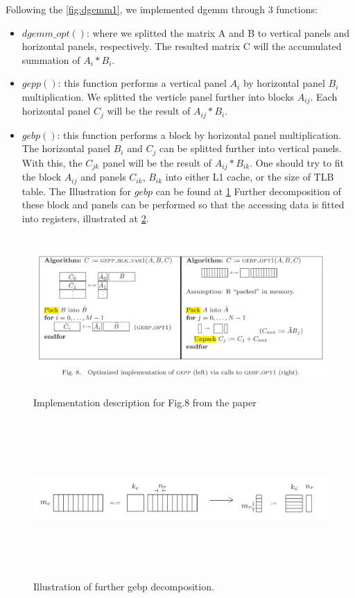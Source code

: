 \documentclass[article]{scrartcl}
\begin{document}
Following the \ref{fig:dgemm1}, we implemented dgemm through 3 functions:
\begin{itemize}
  \item $dgemm\_opt()$: where we splitted the matrix A and B to vertical panels and horizontal panels, respectively. The resulted matrix C will the accumulated summation of $A_i*B_i$.
  \item $gepp()$: this function performs a vertical panel $A_i$ by horizontal panel $B_i$ multiplication. We splitted the verticle panel further into blocks $A_{ij}$. Each horizontal panel $C_j$ will be the result of $A_{ij} * B_i$.
  \item $gebp()$: this function performs a block by horizontal panel multiplication. The horizontal panel $B_i$ and $C_j$ can be splitted further into vertical panels. With this, the $C_{jk}$ panel will be the result of $A_{ij}*B_{ik}$. One should try to fit the block $A_{ij}$ and panels $C_{ik}$, $B_{ik}$ into either L1 cache, or the size of TLB table. The Illustration for $gebp$ can be found at \ref{fig:dgemm2}
  Further decomposition of these block and panels can be performed so that the accessing data is fitted into registers, illustrated at \ref{fig:gebp}.  
\end{itemize}
\begin{figure}[htpb]
    \centering
    \includegraphics[width=\textwidth,height=6cm,keepaspectratio=true]{../figs/dgemm_goto2.png}
    \caption{ Implementation description for Fig.8 from the paper \cite{Goto08}}
        \label{fig:dgemm2}
\end{figure}


\begin{figure}[htpb]
\centering
\includegraphics[width=\textwidth,height=6cm,keepaspectratio=true]{../figs/gebp.png}
\caption{ Illustration of further gebp decomposition.\cite{Goto08}}
\label{fig:gebp}
\end{figure}
\end{document}

